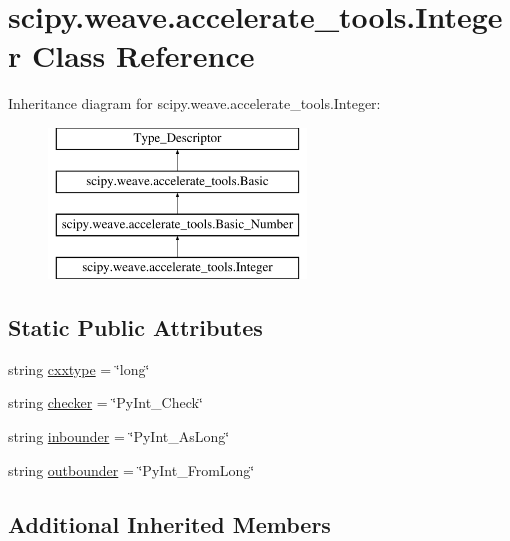 \hypertarget{classscipy_1_1weave_1_1accelerate__tools_1_1Integer}{}\section{scipy.\+weave.\+accelerate\+\_\+tools.\+Integer Class Reference}
\label{classscipy_1_1weave_1_1accelerate__tools_1_1Integer}
Inheritance diagram for scipy.\+weave.\+accelerate\+\_\+tools.\+Integer\+:\begin{figure}[H]
\begin{center}
\leavevmode
\includegraphics[height=4.000000cm]{classscipy_1_1weave_1_1accelerate__tools_1_1Integer}
\end{center}
\end{figure}
\subsection*{Static Public Attributes}
\begin{DoxyCompactItemize}
\item 
string \hyperlink{classscipy_1_1weave_1_1accelerate__tools_1_1Integer_aa9140c5e9c823b279a1f4dd321c355ae}{cxxtype} = \char`\"{}long\char`\"{}
\item 
string \hyperlink{classscipy_1_1weave_1_1accelerate__tools_1_1Integer_a6442ffc591eca031109db68b8ec1567a}{checker} = \char`\"{}Py\+Int\+\_\+\+Check\char`\"{}
\item 
string \hyperlink{classscipy_1_1weave_1_1accelerate__tools_1_1Integer_a2015fa1aeda7219626fccde5297f3074}{inbounder} = \char`\"{}Py\+Int\+\_\+\+As\+Long\char`\"{}
\item 
string \hyperlink{classscipy_1_1weave_1_1accelerate__tools_1_1Integer_a1f20c323905c4888b2441496b6526703}{outbounder} = \char`\"{}Py\+Int\+\_\+\+From\+Long\char`\"{}
\end{DoxyCompactItemize}
\subsection*{Additional Inherited Members}


